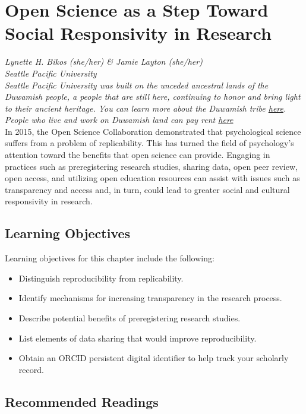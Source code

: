 \documentclass[
  11pt,
]{book}
\providecommand{\tightlist}{%
  \setlength{\itemsep}{0pt}\setlength{\parskip}{0pt}}
\begin{document}
\chapter{Open Science as a Step Toward Social Responsivity in Research}\label{OpSci}

\emph{Lynette H. Bikos (she/her) \& Jamie Layton (she/her)}\\
\emph{Seattle Pacific University}\\
\emph{Seattle Pacific University was built on the unceded ancestral lands of the Duwamish people, a people that are still here, continuing to honor and bring light to their ancient heritage. You can learn more about the Duwamish tribe \href{https://www.duwamishtribe.org/}{here}. People who live and work on Duwamish land can pay rent \href{https://www.realrentduwamish.org/}{here}}\\

In 2015, the Open Science Collaboration demonstrated that psychological science suffers from a problem of replicability. This has turned the field of psychology's attention toward the benefits that open science can provide. Engaging in practices such as preregistering research studies, sharing data, open peer review, open access, and utilizing open education resources can assist with issues such as transparency and access and, in turn, could lead to greater social and cultural responsivity in research.

\section{Learning Objectives}\label{learning-objectives-4}

Learning objectives for this chapter include the following:

\begin{itemize}
\tightlist
\item
  Distinguish reproducibility from replicability.
\item
  Identify mechanisms for increasing transparency in the research process.
\item
  Describe potential benefits of preregistering research studies.
\item
  List elements of data sharing that would improve reproducibility.
\item
  Obtain an ORCID persistent digital identifier to help track your scholarly record.
\end{itemize}

\section{Recommended Readings}\label{recommended-readings-1}
\end{document}
